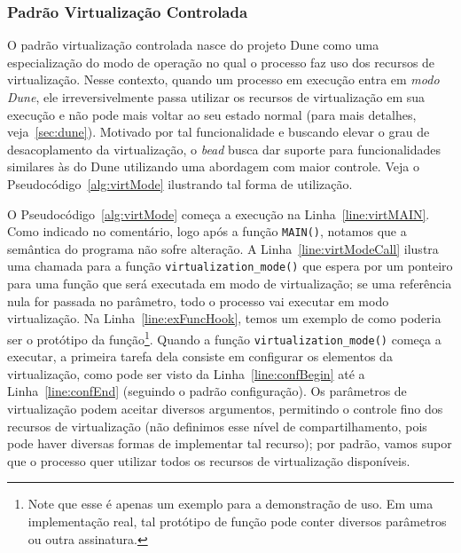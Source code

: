 \subsubsection{Padrão Virtualização Controlada}

O padrão virtualização controlada nasce do projeto Dune como uma especialização
do modo de operação no qual o processo faz uso dos recursos de virtualização.
Nesse contexto, quando um processo em execução entra em \emph{modo Dune}, ele
irreversivelmente passa utilizar os recursos de virtualização em sua execução e
não pode mais voltar ao seu estado normal (para mais detalhes,
veja~\ref{sec:dune}). Motivado por tal funcionalidade e buscando elevar o grau
de desacoplamento da virtualização, o \emph{bead} busca dar suporte para
funcionalidades similares às do Dune utilizando uma abordagem com maior
controle. Veja o Pseudocódigo~\ref{alg:virtMode} ilustrando tal forma de
utilização.



O Pseudocódigo~\ref{alg:virtMode} começa a execução na
Linha~\ref{line:virtMAIN}. Como indicado no comentário, logo após a função
\texttt{MAIN()}, notamos que a semântica do programa não sofre alteração. A
Linha~\ref{line:virtModeCall} ilustra uma chamada para a função
\texttt{virtualization\_mode()} que espera por um ponteiro para uma função que
será executada em modo de virtualização; se uma referência nula for passada no
parâmetro, todo o processo vai executar em modo virtualização. Na
Linha~\ref{line:exFuncHook}, temos um exemplo de como poderia ser o
protótipo da função\footnote{Note que esse é apenas um exemplo para a
demonstração de uso. Em uma implementação real, tal protótipo de função pode
conter diversos parâmetros ou outra assinatura.}. Quando a função
\texttt{virtualization\_mode()} começa a executar, a primeira tarefa dela
consiste em configurar os elementos da virtualização, como pode ser visto da
Linha~\ref{line:confBegin} até a Linha~\ref{line:confEnd} (seguindo o padrão
configuração). Os parâmetros de virtualização podem aceitar diversos argumentos,
permitindo o controle fino dos recursos de virtualização (não definimos esse
nível de compartilhamento, pois pode haver diversas formas de implementar tal
recurso); por padrão, vamos supor que o processo quer utilizar todos os
recursos de virtualização disponíveis.

